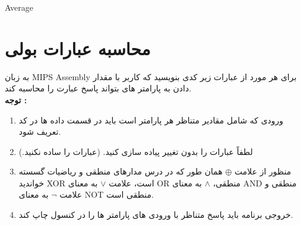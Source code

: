 \begin{latin}
\begin{listing}[H]
    \inputminted[linenos=true]{asm}{sources/Average.mips}
    \caption{Average}
    \label{Average}
\end{listing}
\end{latin}


\section{محاسبه عبارات بولی}
{به زبان MIPS Assembly برای هر مورد از عبارات زیر کدی بنویسید که کاربر با مقدار دادن به پارامتر های  بتواند پاسخ عبارت را محاسبه کند.}\\
\bf {توجه :}
\normalfont
\begin{enumerate}
    \item {ورودی که شامل مقادیر متناظر هر پارامتر است باید در قسمت داده ها در کد تعریف شود.}\\
    \item {لطفاً عبارات را بدون تغییر پیاده سازی کنید. (عبارات را ساده نکنید.)}
    \item {منظور از علامت $\oplus$ همان طور که در درس مدارهای منطقی و ریاضیات گسسته خواندید XOR است،  علامت $\lor$ به معنای OR منطقی، $\land$ به معنای AND منطقی و علامت $\lnot$ به معنای NOT منطقی است.}
    \item {خروجی برنامه باید پاسخ متناظر با ورودی های پارامتر ها را در کنسول چاپ کند.}
\end{enumerate}
